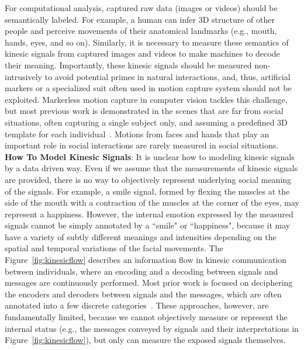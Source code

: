 For computational analysis, captured raw data (images or videos) should be semantically labeled. For example, a human can infer 3D structure of other people and perceive movements of their anatomical landmarks (e.g., mouth, hands, eyes, and so on). Similarly, it is necessary to measure these semantics of kinesic signals from captured images and videos to make machines to decode their meaning. Importantly, these kinesic signals should be measured non-intrusively to avoid potential primes in natural interactions, and, thus, artificial markers or a specialized suit often used in motion capture system should not be exploited. Markerless motion capture in computer vision tackles this challenge, but most previous work is demonstrated in the scenes that are far from social situations, often capturing a single subject only, and assuming a predefined 3D template for each individual~\cite{Gall-09, Vlasic-08, Brox-10, Stoll-11, deAguiar-2008, Vlasic-2008}. Motions from faces and hands that play an important role in social interactions are rarely measured in social situations.\\

\noindent \textbf{How To Model Kinesic Signals}: 
It is unclear how to modeling kinesic signals by a data driven way. Even if we assume that the measurements of kinesic signals are provided, there is no way to objectively represent underlying social meaning of the signals. For example, a smile signal, formed by flexing the muscles at the side of the mouth with a contraction of the muscles at the corner of the eyes, may represent a happiness. However, the internal emotion expressed by the measured signals cannot be simply annotated by a ``smile" or ``happiness", because it may have a variety of subtly different meanings and intensities depending on the spatial and temporal variations of the facial movements. The Figure~\ref{fig:kinesicflow} describes an information flow in kinesic communication between individuals, where an encoding and a decoding between signals and messages are continuously performed. Most prior work is focused on deciphering the encoders and decoders between signals and the messages, which are often annotated into a few discrete categories~\cite{pantic2000automatic,cowie2001emotion,shan2009facial,cowie2001emotion,gunes2006bimodal}. These approaches, however, are fundamentally limited, because we cannot objectively measure or represent the internal status (e.g., the messages conveyed by signals and their interpretations in Figure~\ref{fig:kinesicflow}), but only can measure the exposed signals themselves.

